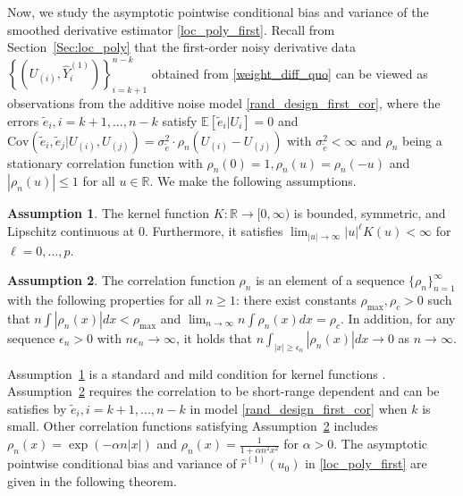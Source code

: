 \documentclass{uwstat572}
\theoremstyle{definition}
\newtheorem{assump}{Assumption}
\renewcommand{\hat}{\widehat}
\renewcommand{\tilde}{\widetilde}
\theoremstyle{theorem}
\begin{document}
Now, we study the asymptotic pointwise conditional bias and variance of the smoothed derivative estimator \eqref{loc_poly_first}. Recall from Section~\ref{Sec:loc_poly} that the first-order noisy derivative data $\left\{\left(U_{(i)},\hat{Y}_i^{(1)}\right)\right\}_{i=k+1}^{n-k}$ obtained from \eqref{weight_diff_quo} can be viewed as observations from the additive noise model \eqref{rand_design_first_cor}, where the errors $\tilde{e}_i, i=k+1,...,n-k$ satisfy $\mathbb{E}\left[\tilde{e}_i|U_i\right]=0$ and $\mathrm{Cov}\left(\tilde{e}_i,\tilde{e}_j | U_{(i)},U_{(j)} \right) = \sigma_{\tilde{e}}^2 \cdot \rho_n(U_{(i)}-U_{(j)})$ with $\sigma_{\tilde{e}}^2 <\infty$ and $\rho_n$ being a stationary correlation function with $\rho_n(0)=1, \rho_n(u) = \rho_n(-u)$ and $|\rho_n(u)|\leq 1$ for all $u\in \mathbb{R}$. We make the following assumptions.
\begin{assump}
\label{assump:kernel}
The kernel function $K:\mathbb{R}\to [0,\infty)$ is bounded, symmetric, and Lipschitz continuous at 0. Furthermore, it satisfies $\lim_{|u|\to \infty} |u|^{\ell} K(u) <\infty$ for $\ell=0,...,p$.
\end{assump}
\begin{assump}
\label{assump:cor_func}
The correlation function $\rho_n$ is an element of a sequence $\{\rho_n\}_{n=1}^{\infty}$ with the following properties for all $n\geq 1$: there exist constants $\rho_{\max}, \rho_c >0$ such that $n\int |\rho_n(x)| dx < \rho_{\max}$ and $\lim_{n\to \infty} n \int \rho_n(x) dx =\rho_c$. In addition, for any sequence $\epsilon_n>0$ with $n\epsilon_n\to \infty$, it holds that $n\int_{|x|\geq \epsilon_n} |\rho_n(x)| dx \to 0$ as $n\to \infty$. 
\end{assump}

Assumption~\ref{assump:kernel} is a standard and mild condition for kernel functions \citep{wasserman2006all}. Assumption~\ref{assump:cor_func} requires the correlation to be short-range dependent \citep{opsomer2001nonparametric} and can be satisfies by $\tilde{e}_i,i=k+1,...,n-k$ in model \eqref{rand_design_first_cor} when $k$ is small. Other correlation functions satisfying Assumption~\ref{assump:cor_func} includes $\rho_n(x) = \exp\left(-\alpha n |x|\right)$ and $\rho_n(x)=\frac{1}{1+\alpha n^2 x^2}$ for $\alpha >0$. The asymptotic pointwise conditional bias and variance of $\hat{r}^{(1)}(u_0)$ in \eqref{loc_poly_first} are given in the following theorem.
\end{document}
